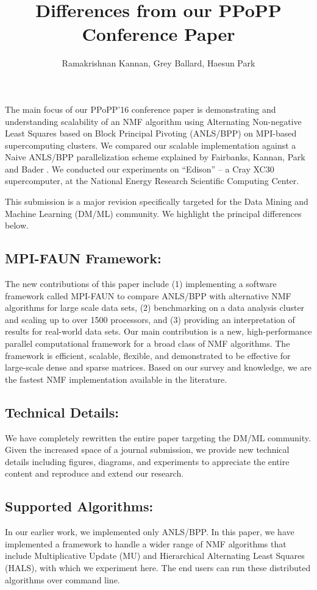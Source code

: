 \documentclass{article}
\begin{document}
\title{Differences from our PPoPP Conference Paper \cite{KBP16}}
\author{Ramakrishnan Kannan, Grey Ballard, Haesun Park}
\maketitle

The main focus of our PPoPP'16 conference paper \cite{KBP16} is demonstrating and understanding scalability of an NMF algorithm using Alternating Non-negative Least Squares based on Block Principal Pivoting (ANLS/BPP) \cite{kim2011fast} on MPI-based supercomputing clusters. We compared our scalable implementation against a Naive ANLS/BPP parallelization scheme explained by Fairbanks, Kannan, Park and Bader \cite{Fairbanks2015}. We conducted our experiments on ``Edison'' -- a Cray XC30 supercomputer, at the National Energy Research Scientific Computing Center.

This submission is a major revision specifically targeted for the Data Mining and Machine Learning (DM/ML) community. We highlight the principal differences below.

\subsection*{MPI-FAUN Framework:}
The new contributions of this paper include (1) implementing a software framework called MPI-FAUN to compare ANLS/BPP with alternative NMF algorithms for large scale data sets, (2) benchmarking on a data analysis cluster and scaling up to over 1500 processors, and (3) providing an interpretation of results for real-world data sets. 
Our main contribution is a new, high-performance parallel computational framework for a broad class of NMF algorithms. The framework is efficient, scalable, flexible, and demonstrated to be effective for large-scale dense and sparse matrices. Based on our survey and knowledge, we are the fastest NMF implementation available in the literature. 

\subsection*{Technical Details:}
We have completely rewritten the entire paper targeting the DM/ML community. Given the increased space of a journal submission, we provide new technical details including figures, diagrams, and experiments to appreciate the entire content and reproduce and extend our research.  

\subsection*{Supported Algorithms:}
In our earlier work, we implemented only ANLS/BPP.  In this paper, we have implemented a framework to handle a wider range of NMF algorithms that include Multiplicative Update (MU) and Hierarchical Alternating Least Squares (HALS), with which we experiment here. The end users can run these distributed algorithms over command line. 
\end{document}
